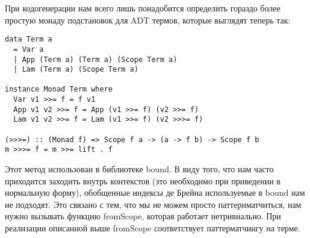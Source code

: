 При кодогенерации нам всего лишь понадобится определить гораздо более простую монаду подстановок для ADT термов, которые выглядят теперь так:


\begin{lstlisting}[frame=single]
data Term a
  = Var a
  | App (Term a) (Term a) (Scope Term a)
  | Lam (Term a) (Scope Term a)

instance Monad Term where
  Var v1 >>= f = f v1
  App v1 v2 >>= f = App (v1 >>= f) (v2 >>= f)
  Lam v1 v2 >>= f = Lam (v1 >>= f) (v2 >>>= f)

(>>>=) :: (Monad f) => Scope f a -> (a -> f b) -> Scope f b
m >>>= f = m >>= lift . f
\end{lstlisting}


Этот метод использован в библиотеке bound\cite{bound}. В виду того, что нам часто приходится заходить внутрь контекстов (это необходимо при приведении в нормальную форму), обобщенные индексы де Брейна используемые в bound нам не подходят. Это связано с тем, что мы не можем просто паттернматчиться, нам нужно вызывать функцию fromScope, которая работает нетривиально. При реализации описанной выше fromScope соответствует паттерматчингу на терме.
